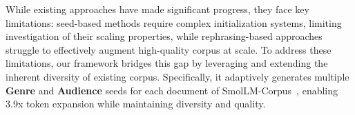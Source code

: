 While existing approaches have made significant progress, they face key limitations:
seed-based methods require complex initialization systems, limiting investigation of their scaling properties,
while rephrasing-based approaches struggle to effectively augment high-quality corpus at scale.
To address these limitations, our framework {\ours} bridges this gap by leveraging and extending the inherent diversity of existing corpus.
Specifically, it adaptively generates multiple \textbf{Genre} and \textbf{Audience} seeds for each document of SmolLM-Corpus~\citep{benallal2024smollmcorpus}, enabling 3.9x token expansion while maintaining diversity and quality.